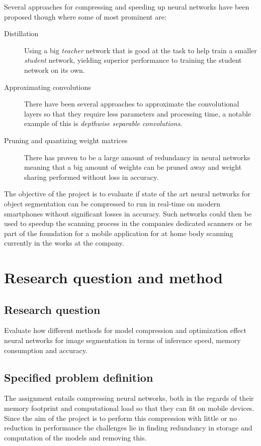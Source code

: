 \documentclass[11pt]{article}
\newcommand{\bibentry}[1]{\cite{#1}}
\begin{document}
Several approaches for compressing and speeding up neural networks have been proposed though where some of most prominent are: 
\begin{description}
\item[{Distillation}] Using a big \emph{teacher} network that is good at the task to help train a smaller \emph{student} network, yielding superior performance to training the student network on its own\bibentry{bucilua2006model}.
\item[{Approximating convolutions}] There have been several approaches to approximate the convolutional layers so that they require less parameters and processing time, a notable example of this is \emph{depthwise separable convolutions}\bibentry{howard2017mobilenets}.
\item[{Pruning and quantizing weight matrices}] There has proven to be a large amount of redundancy in neural networks meaning that a big amount of weights can be pruned away and weight sharing performed without loss in accuracy\bibentry{denil2013predicting}.
\end{description}

The objective of the project is to evaluate if state of the art neural networks for object segmentation can be compressed to run in real-time on modern smartphones without significant losses in accuracy. Such networks could then be used to speedup the scanning process in the companies dedicated scanners or be part of the foundation for a mobile application for at home body scanning currently in the works at the company.


\section{Research question and method}
\label{sec:orgf8af339}
\subsection{Research question}
\label{sec:org7a9897e}
Evaluate how different methods for model compression and optimization effect neural networks for image segmentation in terms of inference speed, memory consumption and accuracy.

\subsection{Specified problem definition}
\label{sec:orga652674}
The assignment entails compressing neural networks, both in the regards of their memory footprint and computational load so that they can fit on mobile devices. Since the aim of the project is to perform this compression with little or no reduction in performance the challenges lie in finding redundancy in storage and computation of the models and removing this.
\end{document}
